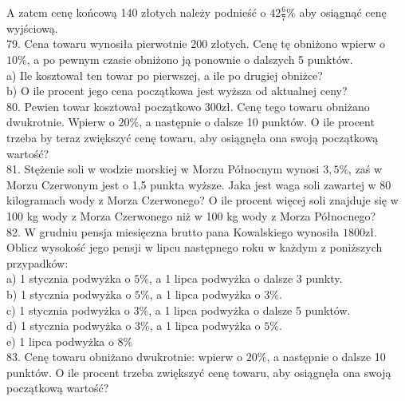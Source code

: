 \documentclass[10pt]{article}
\begin{document}
A zatem cenę końcową 140 złotych należy podnieść o \(42 \frac{6}{7} \%\) aby osiągnąć cenę wyjściową.\\
79. Cena towaru wynosiła pierwotnie 200 złotych. Cenę tę obniżono wpierw o \(10 \%\), a po pewnym czasie obniżono ją ponownie o dalszych 5 punktów.\\
a) Ile kosztował ten towar po pierwszej, a ile po drugiej obniżce?\\
b) O ile procent jego cena początkowa jest wyższa od aktualnej ceny?\\
80. Pewien towar kosztował początkowo \(300 \mathrm{zł}\). Cenę tego towaru obniżano dwukrotnie. Wpierw o \(20 \%\), a następnie o dalsze 10 punktów. O ile procent trzeba by teraz zwiększyć cenę towaru, aby osiągnęła ona swoją początkową wartość?\\
81. Stężenie soli w wodzie morskiej w Morzu Północnym wynosi \(3,5 \%\), zaś w Morzu Czerwonym jest o 1,5 punkta wyższe. Jaka jest waga soli zawartej w 80 kilogramach wody z Morza Czerwonego? O ile procent więcej soli znajduje się w 100 kg wody z Morza Czerwonego niż w 100 kg wody z Morza Północnego?\\
82. W grudniu pensja miesięczna brutto pana Kowalskiego wynosiła \(1800 \mathrm{zł}\). Oblicz wysokość jego pensji w lipcu następnego roku w każdym z poniższych przypadków:\\
a) 1 stycznia podwyżka o \(5 \%\), a 1 lipca podwyżka o dalsze 3 punkty.\\
b) 1 stycznia podwyżka o \(5 \%\), a 1 lipca podwyżka o \(3 \%\).\\
c) 1 stycznia podwyżka o \(3 \%\), a 1 lipca podwyżka o dalsze 5 punktów.\\
d) 1 stycznia podwyżka o \(3 \%\), a 1 lipca podwyżka o \(5 \%\).\\
e) 1 lipca podwyżka o \(8 \%\)\\
83. Cenę towaru obniżano dwukrotnie: wpierw o \(20 \%\), a następnie o dalsze 10 punktów. O ile procent trzeba zwiększyć cenę towaru, aby osiągnęła ona swoją początkową wartość?
\end{document}
